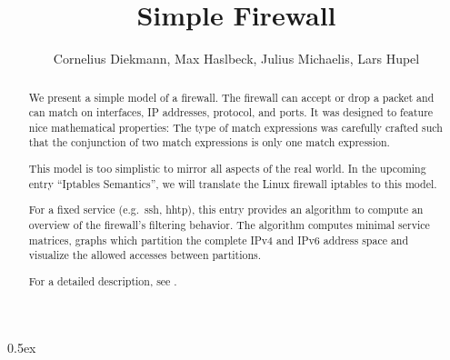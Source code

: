 \documentclass[11pt,a4paper]{article}
\begin{document}
\title{Simple Firewall}
\author{Cornelius Diekmann, Max Haslbeck, Julius Michaelis, Lars Hupel}
\maketitle

\begin{abstract}  
  We present a simple model of a firewall. 
  The firewall can accept or drop a packet and can match on interfaces, IP addresses, protocol, and ports. 
  It was designed to feature nice mathematical properties: 
  The type of match expressions was carefully crafted such that the conjunction of two match expressions is only one match expression. 
  
  This model is too simplistic to mirror all aspects of the real world. 
  In the upcoming entry ``Iptables Semantics'', we will translate the Linux firewall iptables to this model. 
  
  For a fixed service (e.g.\ ssh, hhtp), this entry provides an algorithm to compute an overview of the firewall's filtering behavior. 
  The algorithm computes minimal service matrices, \ie graphs which partition the complete IPv4 and IPv6 address space and visualize the allowed accesses between partitions. 

For a detailed description, see \cite{diekmann2016networking}. 
\end{abstract}

\tableofcontents

\parindent 0pt\parskip 0.5ex



%
%
\end{document}
